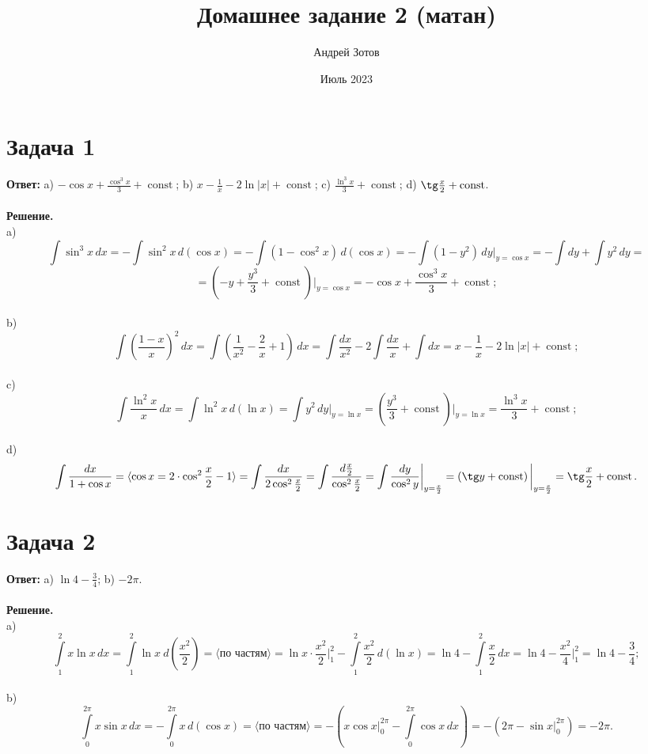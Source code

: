 \documentclass{article}
\title{Домашнее задание 2 (матан)}
\author{Андрей Зотов}
\date{Июль 2023}
\DeclareMathOperator{\const}{const}
\begin{document}
\maketitle

\section*{Задача 1}
{\bf Ответ:} a) $-\cos x+\frac{\cos^3 x}{3}+\const$; b) $x-\frac{1}{x}-2\ln |x|+\const$; c) $\frac{\ln^3 x}{3}+\const$; d) $\tg \frac{x}{2}+\const$.
\\
\\
{\bf Решение.}
\\
a)
$$\int \sin^3 x \,dx=-\int \sin^2 x \,d(\cos x)=-\int (1-\cos^2 x) \,d(\cos x)=-\int (1-y^2)\,dy\bigg|_{y=\cos x}=-\int dy+\int y^2\,dy=$$
$$=\left(-y+\frac{y^3}{3}+\const\right)\bigg|_{y=\cos x}=-\cos x+\frac{\cos^3 x}{3}+\const;$$
\\
b)
$$\int \left(\frac{1-x}{x}\right)^2\,dx=\int\left(\frac{1}{x^2}-\frac{2}{x}+1\right)\,dx=\int \frac{dx}{x^2}-2\int \frac{dx}{x}+\int dx=x-\frac{1}{x}-2\ln |x|+\const;$$
\\
c)
$$\int \frac{\ln^2 x}{x}\,dx=\int \ln^2 x\, d(\ln x)=\int y^2\, dy\bigg|_{y=\ln x}=\left(\frac{y^3}{3}+\const\right)\bigg|_{y=\ln x}=\frac{\ln^3 x}{3}+\const;$$
\\
d)
$$\int \frac{dx}{1+\cos x}=\langle \cos x = 2\cdot\cos^2\frac{x}{2}-1\rangle=\int \frac{dx}{2\cos^2 \frac{x}{2}}=\int \frac{d\frac{x}{2}}{\cos^2\frac{x}{2}}=\int \frac{dy}{\cos^2 y}\bigg|_{y=\frac{x}{2}}=\left(\tg y +\const\right)\bigg|_{y=\frac{x}{2}}=\tg\frac{x}{2}+\const.$$
\section*{Задача 2}
{\bf Ответ:} a) $\ln 4 - \frac{3}{4}$; b) $-2\pi$.
\\
\\
{\bf Решение.}
\\
a)
$$\int\limits_1^2 x\ln x\, dx=\int\limits_1^2 \ln x\ d\left(\frac{x^2}{2}\right)=\langle \textrm{по частям}\rangle=\ln x \cdot \frac{x^2}{2}\bigg|_1^2-\int\limits_1^2 \frac{x^2}{2}\,d(\ln x)=\ln 4 - \int\limits_1^2\frac{x}{2}\,dx=\ln 4 - \frac{x^2}{4}\bigg|_1^2=\ln 4 - \frac{3}{4};$$
\\
b)
$$\int\limits_0^{2\pi} x\sin x\, dx=-\int\limits_0^{2\pi}x\,d(\cos x)=\langle \textrm{по частям} \rangle=-\left(x\cos x\bigg|_0^{2\pi}-\int\limits_0^{2\pi}\cos x\,dx\right)=-\left(2\pi-
\sin x\bigg|_0^{2\pi}\right)=-2\pi.$$
\end{document}
